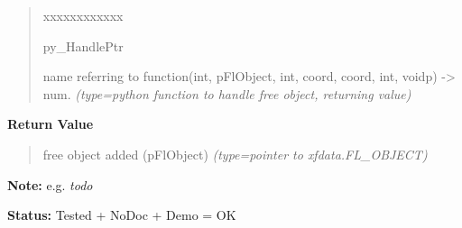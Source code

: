 \begin{boxedminipage}{\funcwidth}
\begin{quote}
\begin{Ventry}{xxxxxxxxxxxx}
          \item[py\_HandlePtr]


name referring to function(int, pFlObject, int, coord, coord, int,
voidp) -> num.
            {\it (type=python function to handle free object, returning value)}

        \end{Ventry}

      \end{quote}

      \textbf{Return Value}
    \vspace{-1ex}

      \begin{quote}

free object added (pFlObject)
      {\it (type=pointer to xfdata.FL\_OBJECT)}

      \end{quote}

\textbf{Note:} 
e.g. \emph{todo}


\textbf{Status:} 
Tested + NoDoc + Demo = OK


    \end{boxedminipage}

    \label{xformslib:flmisc:fl_add_text}

    \vspace{0.5ex}


